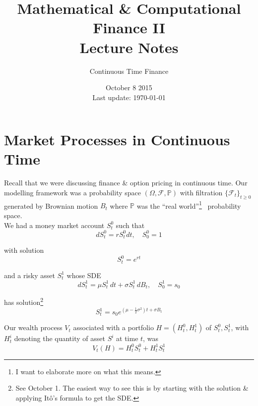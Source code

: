 \documentclass[12pt]{article}
\newlength\tindent
\renewcommand{\indent}{\hspace*{\tindent}}
\begin{document}
 
 
\title{Mathematical \& Computational Finance II\\Lecture Notes}
\author{Continuous Time Finance}
\date{October 8 2015 \\ Last update: \today{}}
\maketitle

\section{Market Processes in Continuous Time}

\indent Recall that we were discussing finance \& option pricing in continuous time. Our modelling framework was a probability space $(\Omega,\mathcal F,\mathbb P)$ with filtration $\{\mathcal F_t\}_{t\geq0}$ generated by Brownian motion $B_t$ where $\mathbb P$ was the ``real world''\footnote{I want to elaborate more on what this means.}~ probability space. \\

We had a money market account $S^0_t$ such that
\begin{equation*}
	dS^0_t = rS^0_tdt, \quad S^0_0 = 1
\end{equation*}

with solution
\begin{equation*}
	S^0_t = e^{rt}
\end{equation*}

and a risky asset $S^1_t$ whose SDE
\begin{equation*}
	dS^1_t = \mu S^1_t\,dt + \sigma S^1_t\,dB_t, \quad S^1_0 = s_0
\end{equation*}

has solution\footnote{See October 1. The easiest way to see this is by starting with the solution \& applying It\^{o}'s formula to get the SDE.}
\begin{equation*}
	S^1_t = s_0e^{(\mu - \frac{1}{2}\sigma^2)t + \sigma B_t}
\end{equation*}

\indent Our wealth process $V_t$ associated with a portfolio $H = (H^0_t,H^1_t)$ of $S^0_t, S^1_t$, with $H^i_t$ denoting the quantity of asset $S^i$ at time $t$, was
\begin{equation*}
	V_t(H) = H^0_tS^0_t + H^1_tS^1_t
\end{equation*}
\end{document}
